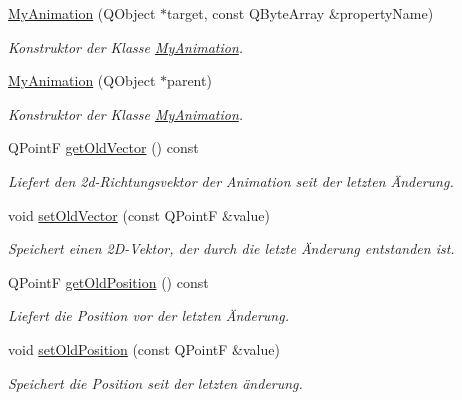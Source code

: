 \begin{DoxyCompactItemize}
\item 
\hyperlink{class_my_animation_afec096e94a98045d3cf87bf4dd247637}{My\-Animation} (Q\-Object $\ast$target, const Q\-Byte\-Array \&property\-Name)
\begin{DoxyCompactList}\small\item\em Konstruktor der Klasse \hyperlink{class_my_animation}{My\-Animation}. \end{DoxyCompactList}\item 
\hyperlink{class_my_animation_a68db19894ccd22277aff4c862a168cfe}{My\-Animation} (Q\-Object $\ast$parent)
\begin{DoxyCompactList}\small\item\em Konstruktor der Klasse \hyperlink{class_my_animation}{My\-Animation}. \end{DoxyCompactList}\item 
Q\-Point\-F \hyperlink{class_my_animation_a3e092d8b292b2317fc9136c0d78ab984}{get\-Old\-Vector} () const 
\begin{DoxyCompactList}\small\item\em Liefert den 2d-\/\-Richtungsvektor der Animation seit der letzten Änderung. \end{DoxyCompactList}\item 
void \hyperlink{class_my_animation_a3c83b6a68871f54a5a561c134db4cba2}{set\-Old\-Vector} (const Q\-Point\-F \&value)
\begin{DoxyCompactList}\small\item\em Speichert einen 2\-D-\/\-Vektor, der durch die letzte Änderung entstanden ist. \end{DoxyCompactList}\item 
Q\-Point\-F \hyperlink{class_my_animation_a6dddda03203449e45354405d14ffb436}{get\-Old\-Position} () const 
\begin{DoxyCompactList}\small\item\em Liefert die Position vor der letzten Änderung. \end{DoxyCompactList}\item 
void \hyperlink{class_my_animation_adb71d57fddec8dd3ef563f6f0b386710}{set\-Old\-Position} (const Q\-Point\-F \&value)
\begin{DoxyCompactList}\small\item\em Speichert die Position seit der letzten änderung. \end{DoxyCompactList}\end{DoxyCompactItemize}


